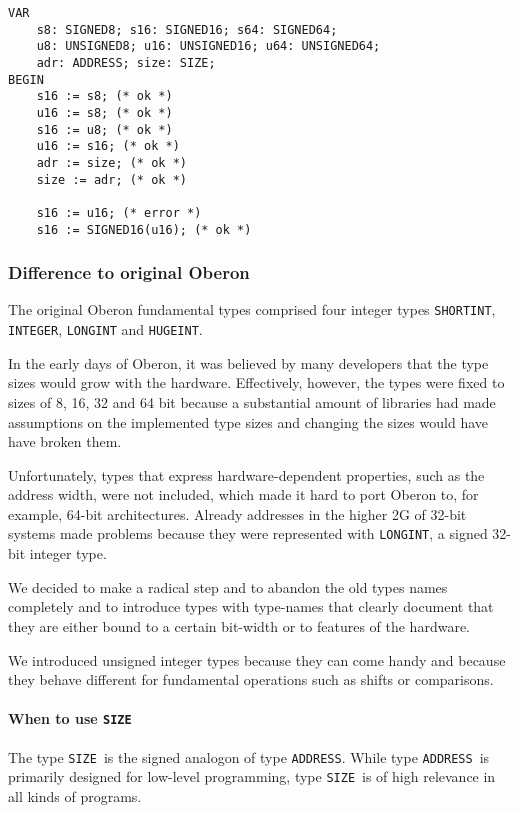 \documentclass[a4wide,11pt]{article}
\newcommand{\ADDRESS}{\lstinline"ADDRESS"}
\newcommand{\SIZE}{\lstinline"SIZE"}
\begin{document}
\begin{annotation}

\begin{lstlisting}[style=example]
VAR
	s8: SIGNED8; s16: SIGNED16; s64: SIGNED64;
	u8: UNSIGNED8; u16: UNSIGNED16; u64: UNSIGNED64;
	adr: ADDRESS; size: SIZE;
BEGIN
	s16 := s8; (* ok *)
	u16 := s8; (* ok *)
	s16 := u8; (* ok *)
	u16 := s16; (* ok *)
	adr := size; (* ok *)
	size := adr; (* ok *)

	s16 := u16; (* error *)
	s16 := SIGNED16(u16); (* ok *)
\end{lstlisting}

\subsubsection{Difference to original Oberon}
The original Oberon fundamental types comprised four integer types \lstinline"SHORTINT", \lstinline"INTEGER", \lstinline"LONGINT" and \lstinline"HUGEINT".

In the early days of Oberon, it was believed by many developers that the type sizes would grow with the hardware.
Effectively, however, the types were fixed to sizes of 8, 16, 32 and 64 bit because a substantial amount of libraries had made assumptions on the implemented type sizes and changing the sizes would have have broken them.

Unfortunately, types that express hardware-dependent properties, such as the address width, were not included, which made it hard to port Oberon to, for example, 64-bit architectures.
Already addresses in the higher 2G of 32-bit systems made problems because they were represented with \lstinline"LONGINT", a signed 32-bit integer type.

We decided to make a radical step and to abandon the old types names completely and to introduce types with type-names that clearly document that they are either bound to a certain bit-width or to features of the hardware.

We introduced unsigned integer types because they can come handy and because they behave different for fundamental operations such as shifts or comparisons.

\paragraph{When to use \SIZE} The type \SIZE\ is the signed analogon of type \ADDRESS.
While type \ADDRESS\ is primarily designed for low-level programming, type \SIZE\ is of high relevance in all kinds of programs.


\end{annotation}
\end{document}
